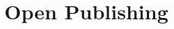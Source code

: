 \documentclass[11pt]{book}
\title{Open Publishing}
\author{}
\begin{document}
\maketitle
\def\title#1{\chapter{#1}}
\tableofcontents

        
        
        
        
        
        
        
        
        
        
\end{document}
